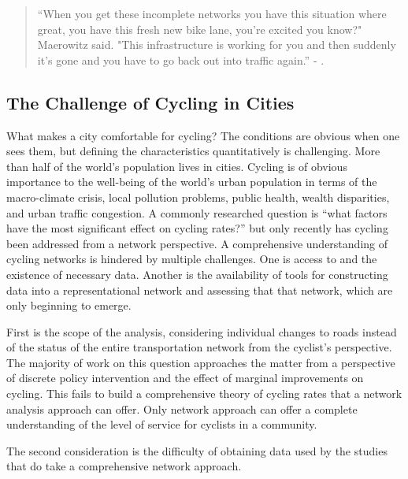 

\begin{quote}
``When you get these incomplete networks you have this situation where great, you have this fresh new bike lane, you're excited you know?" Maerowitz said. "This infrastructure is working for you and then suddenly it's gone and you have to go back out into traffic again.'' - \cite{juhasz2019}.
\end{quote}
 
\subsection{The Challenge of Cycling in Cities}

What makes a city comfortable for cycling? The conditions are obvious when one sees them, but defining the characteristics quantitatively is challenging. More than half of the world's population lives in cities. Cycling is of obvious importance to the well-being of the world's  urban population in terms of the macro-climate crisis, local pollution problems,  public health, wealth disparities, and urban traffic congestion. A commonly researched question is ``what factors have the most significant effect on cycling rates?'' but only recently has cycling been addressed from a network perspective. A comprehensive understanding of cycling networks is hindered by multiple challenges. One is access to and the existence of necessary data. Another is the availability of tools for constructing data into a representational network and assessing that that network, which are only beginning to emerge.   

First is the scope of the analysis, considering individual changes to roads instead of the status of the entire transportation network from the cyclist's perspective.  The majority of work on this question approaches the matter from a perspective of discrete policy intervention and the effect of marginal improvements on cycling. This fails to build a comprehensive theory of cycling rates that a network analysis approach can offer. Only network approach can offer a complete understanding of the level of service for cyclists in a community. 

The second consideration is the difficulty of obtaining data used by the studies that do take a comprehensive network approach. 


